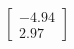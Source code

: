 \documentclass[preview]{standalone}
\begin{document}
\begin{align*}
\begin{bmatrix} -4.94 \\ 2.97 \end{bmatrix}
\end{align*}
\end{document}
